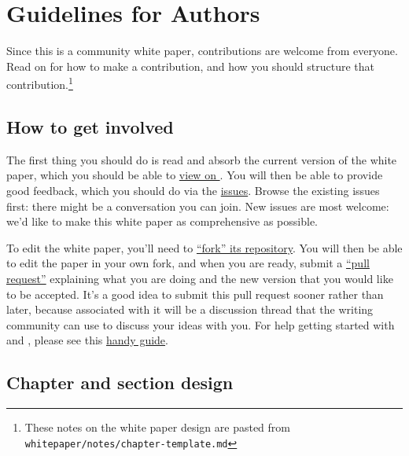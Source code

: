
\section{Guidelines for Authors}
\def\secname{guidelines}\label{sec:\secname}


Since this is a community white paper, contributions are welcome from
everyone. Read on for how to make a contribution, and how you should
structure that contribution.\footnote{These notes on the white paper
design are pasted from \texttt{whitepaper/notes/chapter-template.md}}


\subsection{How to get involved}

The first thing you should do is read and absorb the current version
of the white paper, which you should be able to
\href{http://ls.st/iw2}{view on \GitHub}. You will then be able to
provide good feedback, which you should do via the
\href{https://github.com/LSSTScienceCollaborations/ObservingStrategy/issues}{\GitHub
issues}. Browse the existing issues first: there might be a
conversation you can  join. New issues are most welcome: we'd like to
make this white paper as comprehensive as possible.

To edit the white paper, you'll need to
\href{https://help.github.com/articles/fork-a-repo/}{``fork'' its
repository}. You will then  be able to edit the paper in your own
fork, and when you are ready,  submit a
\href{https://help.github.com/articles/using-pull-requests/}{``pull
request''} explaining what you are doing and the new version that  you
would like to be accepted. It's a good idea to submit this pull
request sooner rather than later, because associated with it will be a
discussion thread that the writing community can use to discuss your
ideas with you. For help getting started with \git and \GitHub, please
see this
\href{https://github.com/drphilmarshall/GettingStarted#top}{handy
guide}.


\subsection{Chapter and section design}

